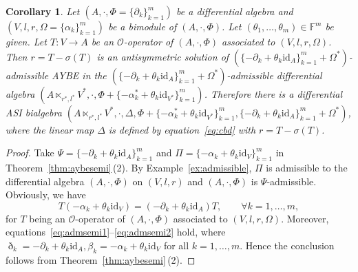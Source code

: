 \documentclass[10pt,a4paper]{amsart}
\numberwithin{equation}{section}
\newtheorem{Corollary}[Theorem]{Corollary}
\newcommand{\id}{\mathrm{id}}
\begin{document}
\begin{Corollary}\label{cor:qminp}
 Let $(A, \cdot, \Phi = \{\partial_k\}_{k=1}^m)$ be a differential algebra and
 $(V, l, r, \Omega = \{\alpha_k\}_{k=1}^m)$ be a bimodule of $(A, \cdot, \Phi)$.
 Let $(\theta_1, \dots, \theta_m) \in \mathbb{F}^m$ be given.
 Let $T\colon V \to A$ be an $\mathcal{O}$-operator of $(A, \cdot, \Phi)$ associated to $(V, l, r,
 \Omega)$.
 Then $r = T - \sigma(T)$ is an antisymmetric solution of $(\{-\partial_k + \theta_k \id_A\}_{k=1}^m + \Omega^*)$-admissible AYBE
 in the
 $(\{-\partial_k + \theta_k \id_A\}_{k=1}^m + \Omega^*)$-admissible
 differential algebra $(A \ltimes_{r^*, l^*}V^*, \cdot ,\Phi + \{-\alpha_k^* + \theta_k \id_{V^*}\}_{k=1}^m)$.
 Therefore there is a differential ASI bialgebra
 $(A \ltimes_{r^*, l^*}V^*,\allowbreak \cdot, \Delta, \Phi + \{-\alpha_k^* + \theta_k \id_{V^*}\}_{k=1}^m, \{-\partial_k + \theta_k \id_A\}_{k=1}^m + \Omega^*)$,
 where the linear map $\Delta$ is defined by equation~\eqref{eq:cbd} with $r = T - \sigma(T)$.
\end{Corollary}
\begin{proof}
 Take $\Psi = \{-\partial_k + \theta_k \id_A\}_{k=1}^m$ and $\Pi = \{-\alpha_k + \theta_k \id_V\}_{k=1}^m$ in Theorem~\ref{thm:aybesemi}\,(2).
 By Example~\ref{ex:admissible},
 $\Pi$ is admissible to the differential algebra $(A,\cdot,\Phi)$ on $(V,l,r)$ and $(A,\cdot, \Phi)$ is $\Psi$-admissible.
 Obviously, we have
 \begin{equation*}
 T (-\alpha_k + \theta_k \id_V) = (-\partial_k + \theta_k \id_A) T, \qquad \forall k=1, \dots, m,
 \end{equation*}
 for $T$ being an $\mathcal{O}$-operator of $(A, \cdot, \Phi)$ associated to $(V, l, r, \Omega)$.
 Moreover, equations~\eqref{eq:admsemi1}--\eqref{eq:admsemi2} hold, where $\eth_k=-\partial_k + \theta_k \id_A, \beta_k=-\alpha_k + \theta_k \id_V$ for all $k=1,\dots, m$.
 Hence the conclusion follows from Theorem~\ref{thm:aybesemi}\,(2).
\end{proof}
\end{document}

